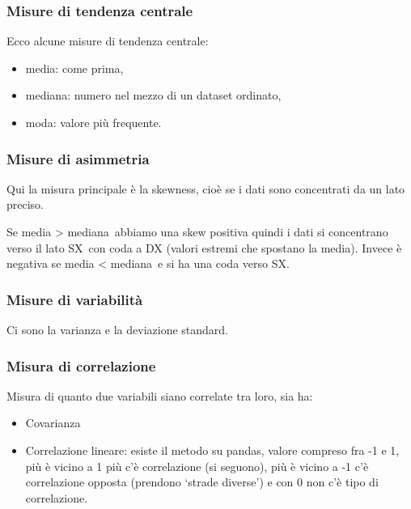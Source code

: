 \documentclass[
]{article}
\providecommand{\tightlist}{%
  \setlength{\itemsep}{0pt}\setlength{\parskip}{0pt}}
\begin{document}
{}

\subsubsection{\texorpdfstring{{M}{isure di tendenza
centrale}}{Misure di tendenza centrale}}\label{h.ryfray9l6boy}

{Ecco alcune misure di tendenza centrale:}

\begin{itemize}
\tightlist
\item
  {media}{: come prima,}
\item
  {mediana}{: numero nel mezzo di un dataset ordinato,}
\item
  {moda}{: valore più frequente.}
\end{itemize}

{}

\subsubsection{\texorpdfstring{{Misure di
asimmetria}}{Misure di asimmetria}}\label{h.5di6yf1a5b45}

{Qui la misura principale è la }{skewness}{, cioè se i dati sono
concentrati da un lato preciso. }

{Se }{media \textgreater{} mediana}{~abbiamo una skew }{positiva
}{quindi i }{dati si concentrano verso il lato SX}{~con coda a DX
(valori estremi che spostano la media). Invece è }{negativa }{se }{media
\textless{} mediana}{~e si ha una }{coda verso SX}{.}

{}

\subsubsection{\texorpdfstring{{Misure di
variabilità}}{Misure di variabilità}}\label{h.tgl8isp40aua}

{Ci sono la varianza e la deviazione standard.}

{}

\subsubsection{\texorpdfstring{{Misura di
correlazione}}{Misura di correlazione}}\label{h.63ezrae0336y}

{Misura di quanto due variabili siano correlate tra loro, sia ha:}

\begin{itemize}
\tightlist
\item
  {Covarianza}
\item
  {Correlazione lineare}{: esiste il metodo su pandas, valore compreso
  fra -1 e 1, più è vicino a 1 più c'è correlazione (si seguono), più è
  vicino a -1 c'è correlazione opposta (prendono `strade diverse') e con
  0 non c'è tipo di correlazione.}
\end{itemize}
\end{document}
